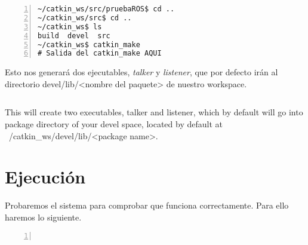 	\begin{lstlisting}[style=consola,numbers=left]
~/catkin_ws/src/pruebaROS$ cd ..
~/catkin_ws/src$ cd ..
~/catkin_ws$ ls
build  devel  src
~/catkin_ws$ catkin_make
# Salida del catkin_make AQUI
	\end{lstlisting}
	
	Esto nos generará dos ejecutables, \emph{talker} y \emph{listener}, que por defecto irán al directorio devel/lib/<nombre del paquete> de nuestro workspace.
	
	\begin{lstlisting}[style=consola,numbers=left]

	\end{lstlisting}
	This will create two executables, talker and listener, which by default will go into package directory of your devel space, located by default at ~/catkin_ws/devel/lib/<package name>.
	
	\section{Ejecución}
	Probaremos el sistema para comprobar que funciona correctamente. Para ello haremos lo siguiente.
	
	\begin{lstlisting}[style=consola,numbers=left]
	
	\end{lstlisting}